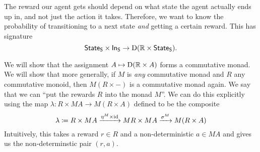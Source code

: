 \documentclass[DynamicalBook]{subfiles}
\begin{document}
The reward our agent gets should depend on what state the
agent actually ends up in, and not just the action it takes. Therefore, we want to know the probability of transitioning to a next state \emph{and}
getting a certain reward. This has signature
\[
  \mathsf{State}_{\mathsf{S}} \times \mathsf{In}_{\mathsf{S}} \to \mathrm{D}(\mathbb{R} \times \mathsf{State}_{\mathsf{S}}).
\]

We will show that the assignment $A \mapsto \mathrm{D}(\mathbb{R} \times A)$
 forms a commutative monad. We will show that more generally, if $M$ is
 \emph{any} commutative monad and $R$ any commutative monoid, then $M(R \times
 -)$ is a commutative monad again. We say that we can ``put the rewards $R$ into
 the monad $M$''. We can do this explicitly using the map $\lambda : R \times MA
 \to M(R \times A)$ defined to be the composite
 \[
\lambda \coloneqq R \times MA \xrightarrow{\eta^M \times \mathrm{id}} MR \times MA \xrightarrow{\sigma^M} M(R \times A)
 \]
Intuitively, this takes a reward $r \in R$ and a non-deterministic $a \in MA$
and gives us the non-determinstic pair $(r, a)$.
 
\end{document}
